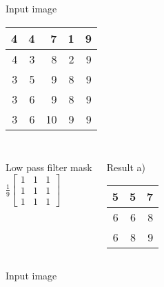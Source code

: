 \documentclass[
        ]{beamer}
\begin{document}
        \begin{frame}[c]{\subsecname }
            \begin{overprint}
            \begin{center} 
            Input image\\           
            \begin{tabular}{|r|r|r|r|r|}
                    \hline
                    4 & 4 & 7  & 1 & 9 \\\hline
                    4 & 3 & 8  & 2 & 9 \\\hline
                    3 & 5 & 9  & 8 & 9 \\\hline
                    3 & 6 & 9  & 8 & 9 \\\hline
                    3 & 6 & 10 & 9 & 9 \\\hline
            \end{tabular}
            \end{center}
            $\;$\\            
            \begin{columns}
            \begin{center} 
            Low pass filter mask\\           
            $ \frac{1}{9} \begin{bmatrix} 1 & 1 & 1\\ 1 & 1 & 1\\ 1 & 1 & 1 \end{bmatrix} $
            \end{center}
            \begin{center}            
            Result a)\\           
            \begin{tabular}{|r|r|r|}
                    \hline
                    5 & 5 & 7  \\\hline
                    6 & 6 & 8  \\\hline
                    6 & 8 & 9  \\\hline
            \end{tabular}
            \end{center}
            \end{columns}
            \begin{center} 
            Input image\\           
            \begin{tabular}{|r|r|r|r|r|}

\end{tabular}
\end{center}
\end{overprint}
\end{frame}
\end{document}
